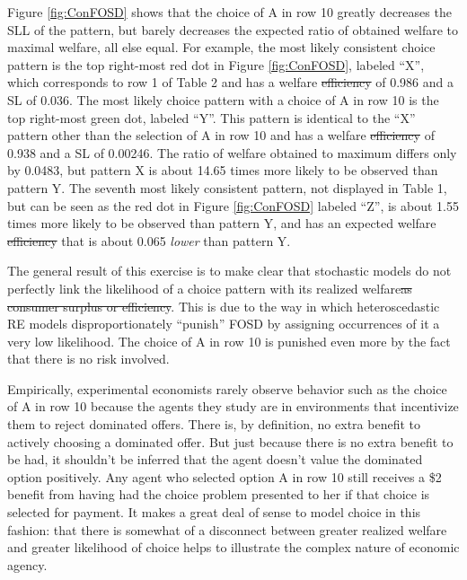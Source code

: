 \documentclass[11pt,a4paper]{article} %
\providecommand{\DIFaddtex}[1]{{\protect\color{blue}\uwave{#1}}} %
\providecommand{\DIFdeltex}[1]{{\protect\color{red}\sout{#1}}}                      %
\providecommand{\DIFaddbegin}{} %
\providecommand{\DIFaddend}{} %
\providecommand{\DIFdelbegin}{} %
\providecommand{\DIFdelend}{} %
\providecommand{\DIFadd}[1]{\texorpdfstring{\DIFaddtex{#1}}{#1}} %
\providecommand{\DIFdel}[1]{\texorpdfstring{\DIFdeltex{#1}}{}} %
\newcommand{\DIFscaledelfig}{0.5}
\newlength{\DIFdelgraphicswidth} %
\newlength{\DIFdelgraphicsheight} %
\newcommand{\DIFaddincludegraphics}[2][]{{\color{blue}\fbox{\DIFOincludegraphics[#1]{#2}}}} %
\newcommand{\DIFdelincludegraphics}[2][]{%
\sbox{\DIFdelgraphicsbox}{\DIFOincludegraphics[#1]{#2}}%
\settoboxwidth{\DIFdelgraphicswidth}{\DIFdelgraphicsbox} %
\settoboxtotalheight{\DIFdelgraphicsheight}{\DIFdelgraphicsbox} %
\scalebox{\DIFscaledelfig}{%
\parbox[b]{\DIFdelgraphicswidth}{\usebox{\DIFdelgraphicsbox}\\[-\baselineskip] \rule{\DIFdelgraphicswidth}{0em}}\llap{\resizebox{\DIFdelgraphicswidth}{\DIFdelgraphicsheight}{%
\setlength{\unitlength}{\DIFdelgraphicswidth}%
\begin{picture}(1,1)%
\thicklines\linethickness{2pt} %
{\color[rgb]{1,0,0}\put(0,0){\framebox(1,1){}}}%
{\color[rgb]{1,0,0}\put(0,0){\line( 1,1){1}}}%
{\color[rgb]{1,0,0}\put(0,1){\line(1,-1){1}}}%
\end{picture}%
}\hspace*{3pt}}} %
} %
\DeclareRobustCommand{\DIFaddbegin}{\DIFOaddbegin \let\includegraphics\DIFaddincludegraphics} %
\DeclareRobustCommand{\DIFaddend}{\DIFOaddend \let\includegraphics\DIFOincludegraphics} %
\DeclareRobustCommand{\DIFdelbegin}{\DIFOdelbegin \let\includegraphics\DIFdelincludegraphics} %
\DeclareRobustCommand{\DIFdelend}{\DIFOaddend \let\includegraphics\DIFOincludegraphics} %
\begin{document}
Figure \ref{fig:ConFOSD} shows that the choice of A in row 10 greatly decreases the SLL of the pattern, but barely decreases the expected ratio of obtained welfare to maximal welfare, all else equal.
For example, the most likely consistent choice pattern is the top right-most red dot in Figure \ref{fig:ConFOSD}, labeled \enquote{X}, which corresponds to row 1 of Table 2 and has a welfare \DIFdelbegin \DIFdel{efficiency }\DIFdelend \DIFaddbegin \DIFadd{ratio }\DIFaddend of 0.986 and a SL of 0.036.
The most likely choice pattern with a choice of A in row 10 is the top right-most green dot, labeled \enquote{Y}.
This pattern is identical to the \enquote{X} pattern other than the selection of A in row 10 and has a welfare \DIFdelbegin \DIFdel{efficiency }\DIFdelend \DIFaddbegin \DIFadd{proportion }\DIFaddend of 0.938 and a SL of 0.00246.
The ratio of welfare obtained to maximum differs only by 0.0483, but pattern X is about 14.65 times more likely to be observed than pattern Y.
The seventh most likely consistent pattern, not displayed in Table 1, but can be seen as the red dot in Figure \ref{fig:ConFOSD} labeled \enquote{Z}, is about 1.55 times more likely to be observed than pattern Y, and has an expected welfare \DIFdelbegin \DIFdel{efficiency }\DIFdelend \DIFaddbegin \DIFadd{ratio }\DIFaddend that is about 0.065 \textit{lower} than pattern Y.

The general result of this exercise is to make clear that stochastic models do not perfectly link the likelihood of a choice pattern with its realized welfare\DIFdelbegin \DIFdel{as consumer surplus or efficiency}\DIFdelend .
This is due to the way in which heteroscedastic RE models disproportionately \enquote{punish} FOSD by assigning occurrences of it a very low likelihood.
The choice of A in row 10 is punished even more by the fact that there is no risk involved.
\DIFdelbegin %

\DIFdelend Empirically, experimental economists rarely observe behavior such as the choice of A in row 10 because the agents they study are in environments that incentivize them to reject dominated offers.
There is, by definition, no extra benefit to actively choosing a dominated offer.
But just because there is no extra benefit to be had, it shouldn't be inferred that the agent doesn't value the dominated option positively.
Any agent who selected option A in row 10 still receives a \$2 benefit from having had the choice problem presented to her if that choice is selected for payment.
It makes a great deal of sense to model choice in this fashion: that there is somewhat of a disconnect between greater realized welfare and greater likelihood of choice helps to illustrate the complex nature of economic agency.
\end{document}
